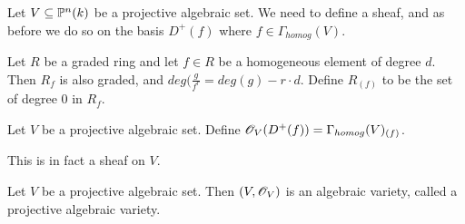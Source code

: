 Let $V\subseteq \P^n(k)$ be a projective algebraic set. We need to define a sheaf, and as before we do so on the basis $D^+(f)$ where $f\in\Gamma_{homog}(V)$. 

\begin{definition}
Let $R$ be a graded ring and let $f\in R$ be a homogeneous element of degree $d$. Then $R_f$ is also graded, and $deg(\frac{g}{f^r}=deg(g) - r\cdot d$. Define $R_{(f)}$ to be the set of degree $0$ in $R_f$. 
\end{definition}

\begin{definition}
Let $V$ be a projective algebraic set. Define $\O_V(D^+(f))=\Gamma_{homog}(V)_{(f)}$.
\end{definition}

This is in fact a sheaf on $V$. 

\begin{proposition}
Let $V$ be a projective algebraic set. Then $(V, \O_V)$ is an algebraic variety, called a projective algebraic variety. 
\end{proposition}